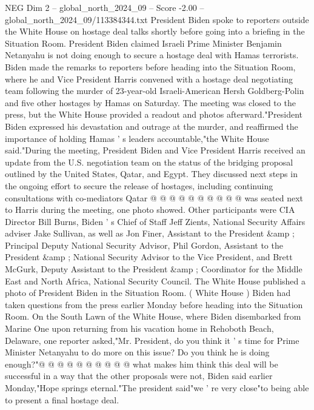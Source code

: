 \begin{textsample}{NEG Dim 2 – global\_north\_2024\_09 – Score -2.00 – global\_north\_2024\_09/113384344.txt}  \label{ex:f2_neg_029}
President Biden spoke to reporters outside the White House on hostage deal talks shortly before going into a briefing in the Situation Room.
President Biden claimed Israeli Prime Minister Benjamin Netanyahu is not doing enough to secure a hostage deal with Hamas terrorists.
Biden made the remarks to reporters before heading into the Situation Room, where he and Vice President Harris convened with a hostage deal negotiating team following the murder of 23-year-old Israeli-American Hersh Goldberg-Polin and five other hostages by Hamas on Saturday.
The meeting was closed to the press, but the White House provided a readout and photos afterward."President Biden expressed his devastation and outrage at the murder, and reaffirmed the importance of holding Hamas ' s leaders accountable,"the White House said."During the meeting, President Biden and Vice President Harris received an update from the U.S. negotiation team on the status of the bridging proposal outlined by the United States, Qatar, and Egypt.
They discussed next steps in the ongoing effort to secure the release of hostages, including continuing consultations with co-mediators Qatar @ @ @ @ @ @ @ @ @ @ was seated next to Harris during the meeting, one photo showed.
Other participants were CIA Director Bill Burns, Biden ' s Chief of Staff Jeff Zients, National Security Affairs adviser Jake Sullivan, as well as Jon Finer, Assistant to the President \&amp ; Principal Deputy National Security Advisor, Phil Gordon, Assistant to the President \&amp ; National Security Advisor to the Vice President, and Brett McGurk, Deputy Assistant to the President \&amp ; Coordinator for the Middle East and North Africa, National Security Council.
The White House published a photo of President Biden in the Situation Room. ( White House ) Biden had taken questions from the press earlier Monday before heading into the Situation Room.
On the South Lawn of the White House, where Biden disembarked from Marine One upon returning from his vacation home in Rehoboth Beach, Delaware, one reporter asked,"Mr.
President, do you think it ' s time for Prime Minister Netanyahu to do more on this issue?
Do you think he is doing enough?"@ @ @ @ @ @ @ @ @ @ what makes him think this deal will be successful in a way that the other proposals were not, Biden said earlier Monday,"Hope springs eternal."The president said"we ' re very close"to being able to present a final hostage deal.

\end{textsample}
